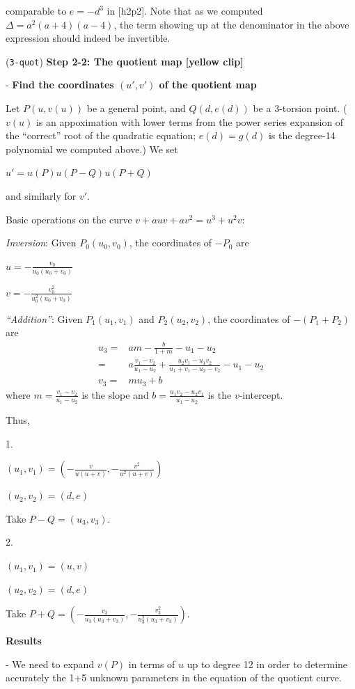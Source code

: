 \documentclass{rs}
\theoremstyle{definition}
\theoremstyle{remark}
\renewcommand{\=}{\approx}
\renewcommand{\-}{\sim}
\numberwithin{equation}{section}
\numberwithin{thm}{section}
\begin{document}
comparable to $e = -d^3$ in [h2p2]. 
Note that as we computed $\Delta = a^2(a + 4)(a - 4)$, the term showing up at the denominator in the above expression should indeed be invertible.  

\newpage
(\texttt{3-quot}) \textbf{Step 2-2: The quotient map [yellow clip]}

- \textbf{Find the coordinates $(u',v')$ of the quotient map}

Let $P(u,v(u))$ be a general point, and $Q(d,e(d))$ be a 3-torsion point. 
($v(u)$ is an appoximation with lower terms from the power series expansion of the ``correct'' root of the quadratic equation; 
$e(d) = g(d)$ is the degree-14 polynomial we computed above.) We set

\centerline{$u' = u(P) u(P-Q) u(P+Q)$}

and similarly for $v'$.

Basic operations on the curve $v + a u v + a v^2 = u^3 + u^2 v$:

\textit{Inversion}: Given $P_0(u_0,v_0)$, the coordinates of $-P_0$ are

\centerline{$u = -\frac{v_0}{u_0(u_0 + v_0)}$}

\centerline{$v = -\frac{v_0^2}{u_0^2(u_0 + v_0)}$}

\textit{``Addition''}: Given $P_1(u_1,v_1)$ and $P_2(u_2,v_2)$, the coordinates of $-(P_1 + P_2)$ are
\begin{align*}
 u_3 = & a m - \frac{b}{1 + m} - u_1 - u_2\\
     = & a \frac{v_1 - v_2}{u_1 - u_2} + \frac{u_2 v_1 - u_1 v_2}{u_1 + v_1 - u_2 - v_2} - u_1 - u_2\\
 v_3 = & m u_3 + b
\end{align*}
where $m = \frac{v_1 - v_2}{u_1 - u_2}$ is the slope and $b = \frac{u_1 v_2 - u_2 v_1}{u_1 - u_2}$ is the $v$-intercept.

Thus,

1.

$(u_1,v_1) = (-\frac{v}{u(u + v)},-\frac{v^2}{u^2(u + v)})$

$(u_2,v_2) = (d,e)$

Take $P - Q = (u_3,v_3)$.

2.

$(u_1,v_1) = (u,v)$

$(u_2,v_2) = (d,e)$

Take $P + Q = (-\frac{v_3}{u_3(u_3 + v_3)},-\frac{v_3^2}{u_3^2(u_3 + v_3)})$.

\textbf{Results}

- We need to expand $v(P)$ in terms of $u$ up to degree 12 in order to determine accurately the 1+5 unknown parameters in the equation of the quotient curve.
\end{document}
